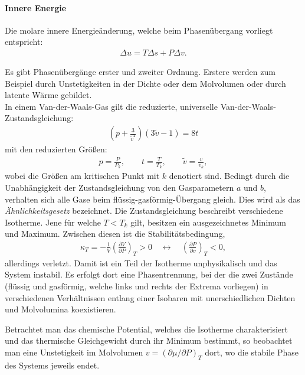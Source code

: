 \paragraph*{Innere Energie}
Die molare innere Energieänderung, welche beim Phasenübergang vorliegt entspricht:
\begin{align*}
    \Delta u=T\Delta s+P\Delta v.
\end{align*}

\begin{summary}
    Es gibt Phasenübergänge erster und zweiter Ordnung. Erstere werden zum Beispiel durch Unstetigkeiten in der Dichte oder dem Molvolumen oder durch latente Wärme gebildet.\\
    In einem Van-der-Waals-Gas gilt die reduzierte, universelle Van-der-Waals-Zustandsgleichung:
    \begin{align*}
        \left(p+\frac{3}{\tilde{v}^2}\right)\left(3\tilde{v}-1\right)=8t
    \end{align*}
    mit den reduzierten Größen:
    \begin{align*}
        p=\frac{P}{P_k}, \qquad t=\frac{T}{T_k}, \qquad \tilde{v}=\frac{v}{v_k},
    \end{align*}
    wobei die Größen am kritischen Punkt mit $k$ denotiert sind.
    Bedingt durch die Unabhängigkeit der Zustandsgleichung von den Gasparametern $a$ und $b$, verhalten sich alle Gase beim flüssig-gasförmig-Übergang gleich. Dies wird als das \emph{Ähnlichkeitsgesetz} bezeichnet.
    Die Zustandsgleichung beschreibt verschiedene Isotherme. Jene für welche $T<T_k$ gilt, besitzen ein ausgezeichnetes Minimum und Maximum. Zwischen diesen ist die Stabilitätsbedingung,
    \begin{align*}
        \kappa_T=-\frac{1}{V}\left(\frac{\partial V}{\partial P}\right)_T>0 \quad \leftrightarrow \quad \left(\frac{\partial P}{\partial v}\right)_T<0,
    \end{align*}
    allerdings verletzt. Damit ist ein Teil der Isotherme unphysikalisch und das System instabil. Es erfolgt dort eine Phasentrennung, bei der die zwei Zustände (flüssig und gasförmig, welche links und rechts der Extrema vorliegen) in verschiedenen Verhältnissen entlang einer Isobaren mit unerschiedlichen Dichten und Molvolumina koexistieren.
    
    Betrachtet man das chemische Potential, welches die Isotherme charakterisiert und das thermische Gleichgewicht durch ihr Minimum bestimmt, so beobachtet man eine Unstetigkeit im Molvolumen $v=\left(\partial \mu/\partial P\right)_T$ dort, wo die stabile Phase des Systems jeweils endet.


\end{summary}
